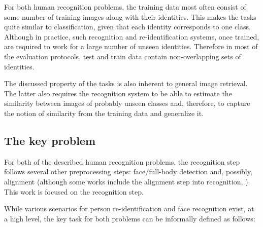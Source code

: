 For both human recognition problems, the training data most often consist of some number of training images along with their identities. This makes the tasks quite similar to classification, given that each identity corresponds to one class. Although in practice, such recognition and re-identification systems, once trained, are required to work for a large number of unseen identities. Therefore in most of the evaluation protocols, test and train data contain non-overlapping sets of identities. 

The discussed property of the tasks is also inherent to general image retrieval. The latter also requires the recognition system to be able to estimate the similarity between images of probably unseen classes and, therefore, to capture the notion of similarity from the training data and generalize it. 

\subsection{The key problem}
For both of the described human recognition problems, the recognition step follows several other  preprocessing steps: face/full-body detection and, possibly, alignment (although some works include the alignment step into recognition, \eg{} \citep{Tadmor2016LearningAM}). This work is focused on the recognition step. 

While various scenarios for person re-identification and face recognition exist, at a high level, the key task for both problems can be informally defined as follows: 


\begin{problem}
\label{pr:similarity_estimation}
\end{problem}



